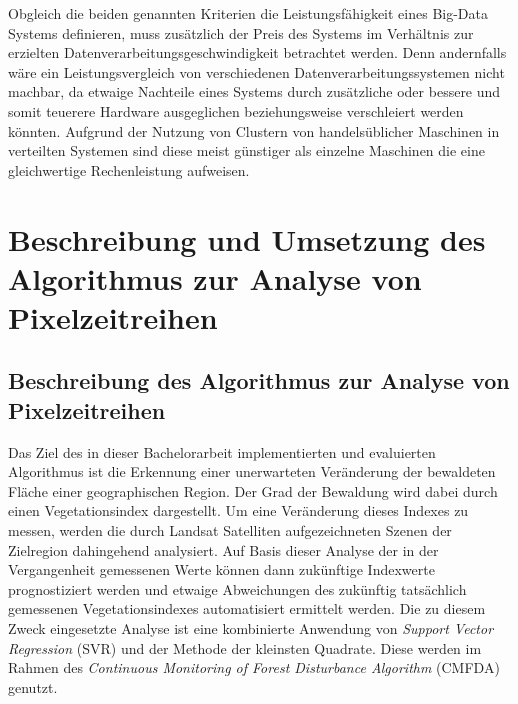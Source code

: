 Obgleich die beiden genannten Kriterien die Leistungsfähigkeit eines Big-Data Systems definieren, muss zusätzlich der Preis des Systems im Verhältnis zur erzielten Datenverarbeitungsgeschwindigkeit betrachtet werden. Denn andernfalls wäre ein Leistungsvergleich von verschiedenen Datenverarbeitungssystemen nicht machbar, da etwaige Nachteile eines Systems durch zusätzliche oder bessere und somit teuerere Hardware ausgeglichen beziehungsweise verschleiert werden könnten. Aufgrund der Nutzung von Clustern von handelsüblicher Maschinen in verteilten Systemen sind diese meist günstiger als einzelne Maschinen die eine gleichwertige Rechenleistung aufweisen.


\chapter[Algorithmus zur Analyse von Pixelzeitreihen]{Beschreibung und Umsetzung des Algorithmus zur Analyse von Pixelzeitreihen}
\label{cha:AlgorithmForSatellitePictureAnalysis}
\section[Beschreibung des Algorithmus]{Beschreibung des Algorithmus zur Analyse von Pixelzeitreihen}
\label{sec:DescriptionOfTheAlgorithm}
Das Ziel des in dieser Bachelorarbeit implementierten und evaluierten Algorithmus ist die Erkennung einer unerwarteten Veränderung der bewaldeten Fläche einer geographischen Region. Der Grad der Bewaldung wird dabei durch einen Vegetationsindex dargestellt. Um eine Veränderung dieses Indexes zu messen, werden die durch Landsat Satelliten aufgezeichneten Szenen der Zielregion dahingehend analysiert. Auf Basis dieser Analyse der in der Vergangenheit gemessenen Werte können dann zukünftige Indexwerte prognostiziert werden und etwaige Abweichungen des zukünftig tatsächlich gemessenen Vegetationsindexes automatisiert ermittelt werden. Die zu diesem Zweck eingesetzte Analyse ist eine kombinierte Anwendung von \textit{Support Vector Regression} (SVR) \cite{Basak2007} und der Methode der kleinsten Quadrate. Diese werden im Rahmen des \textit{Continuous Monitoring of Forest Disturbance Algorithm} (CMFDA) \cite{Zhu2012} genutzt. %

